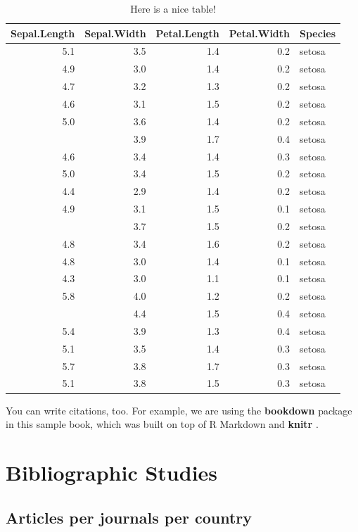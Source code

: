 \documentclass[
]{book}
\begin{document}
\begin{table}

\caption{\label{tab:unnamed-chunk-4}Here is a nice table!}
\centering
\begin{tabular}[t]{rrrrl}
\toprule
Sepal.Length & Sepal.Width & Petal.Length & Petal.Width & Species\\
\midrule
5.1 & 3.5 & 1.4 & 0.2 & setosa\\
4.9 & 3.0 & 1.4 & 0.2 & setosa\\
4.7 & 3.2 & 1.3 & 0.2 & setosa\\
4.6 & 3.1 & 1.5 & 0.2 & setosa\\
5.0 & 3.6 & 1.4 & 0.2 & setosa\\
\addlinespace
5.4 & 3.9 & 1.7 & 0.4 & setosa\\
4.6 & 3.4 & 1.4 & 0.3 & setosa\\
5.0 & 3.4 & 1.5 & 0.2 & setosa\\
4.4 & 2.9 & 1.4 & 0.2 & setosa\\
4.9 & 3.1 & 1.5 & 0.1 & setosa\\
\addlinespace
5.4 & 3.7 & 1.5 & 0.2 & setosa\\
4.8 & 3.4 & 1.6 & 0.2 & setosa\\
4.8 & 3.0 & 1.4 & 0.1 & setosa\\
4.3 & 3.0 & 1.1 & 0.1 & setosa\\
5.8 & 4.0 & 1.2 & 0.2 & setosa\\
\addlinespace
5.7 & 4.4 & 1.5 & 0.4 & setosa\\
5.4 & 3.9 & 1.3 & 0.4 & setosa\\
5.1 & 3.5 & 1.4 & 0.3 & setosa\\
5.7 & 3.8 & 1.7 & 0.3 & setosa\\
5.1 & 3.8 & 1.5 & 0.3 & setosa\\
\bottomrule
\end{tabular}
\end{table}

You can write citations, too. For example, we are using the \textbf{bookdown} package \citep{R-bookdown} in this sample book, which was built on top of R Markdown and \textbf{knitr} \citep{xie2015}.

\hypertarget{bibliographic-studies}{%
\chapter{Bibliographic Studies}\label{bibliographic-studies}}

\hypertarget{articles-per-journals-per-country}{%
\section{Articles per journals per country}\label{articles-per-journals-per-country}}
\end{document}
